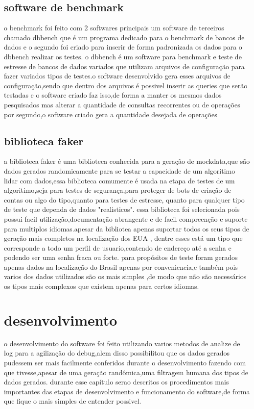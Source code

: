 \documentclass[
	12pt,				%
	openright,			%
	oneside,			%
	a4paper,			%
	english,			%
	french,				%
	spanish,			%
	brazil,				%
	]{abntex2}
\begin{document}
\section{software de benchmark}
\label{sec:software de benchmark}
o benchmark foi feito com 2 softwares principais um software de terceiros chamado dbbench que é um programa dedicado para o benchmark de bancos de dados e o segundo foi criado para inserir de forma padronizada os dados para o dbbench realizar os testes.
o dbbench é um software para benchmark e teste de estresse de bancos de dados variados que utilizam arquivos de configuração para fazer variados tipos de testes.o software desenvolvido gera esses arquivos de configuração,sendo que dentro dos arquivos é possivel inserir as queries que serão testadas e o software criado faz isso,de forma a manter os mesmos dados pesquisados mas alterar a quantidade de consultas recorrentes ou de operações por segundo,o software criado gera a quantidade desejada de operações 

\section{biblioteca faker}
\label{sec:biblioteca faker}
a biblioteca faker é uma biblioteca conhecida para a geração de mockdata,que são dados gerados randomicamente para se testar a capacidade de um algoritimo lidar com dados,essa biblioteca comumente é usada na etapa de testes de um algoritimo,seja para testes de segurança,para proteger de bots de criação de contas ou algo do tipo,quanto para testes de estresse, quanto para qualquer tipo de teste que dependa de dados "realisticos".\newline
essa biblioteca foi selecionada pois possui facil utilização,documentação abrangente e de facil compreenção e suporte para multiplos idiomas.apesar da bibliotea apenas suportar todos os seus tipos de geração mais completos na localização dos EUA , dentre esses está um tipo que corresponde a todo um perfil de usuario,contendo de endereço até a senha e podendo ser uma senha fraca ou forte.\newline
para propósitos de teste foram gerados apenas dados na localização do Brasil apenas por conveniencia,e também pois varios dos dados utilizados são os mais simples ,de modo que não são necessários os tipos mais complexos que existem apenas para certos idiomas.
\chapter{desenvolvimento}
\label{ch: desenvolvimento}
o desenvolvimento do software foi feito utilizando varios metodos de analize de log para a agilização do debug,alem disso possibilitou que os dados gerados pudessem ser mais facilmente conferidos durante o desenvolvimento fazendo com que tivesse,apesar de uma geração randômica,uma filtragem humana dos tipos de dados gerados.\newline
durante esse capítulo serao descritos os procedimentos mais importantes das etapas de desenvolvimento e funcionamento do software,de forma que fique o mais simples de entender possivel.\newline
\end{document}
